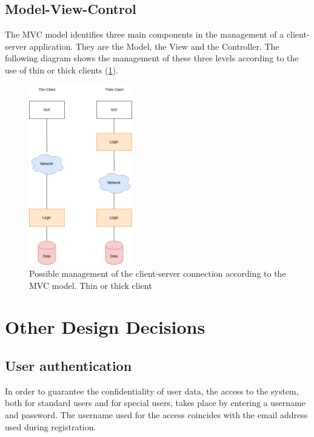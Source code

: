 \clearpage
\subsection{Model-View-Control}
The MVC model identifies three main components in the management of a client-server application. They are the Model, the View and the Controller.
The following diagram shows the management of these three levels according to the use of thin or thick clients (\ref{img:client_server}).

\begin{figure}[H]
  \begin{center}
  	\includegraphics[width=0.4\textwidth]{./img/client_server.png}
    \hspace{0.05\linewidth}
    \centering
    \caption{Possible management of the client-server connection according to the MVC model. Thin or thick client}
		\label{img:client_server}
    \end{center}
\end{figure}


\section{Other Design Decisions}
\subsection{User authentication}
In order to guarantee the confidentiality of user data, the access to the system, both for standard users and for special users, takes place by entering a username and password.
The username used for the access coincides with the email address used during registration.


